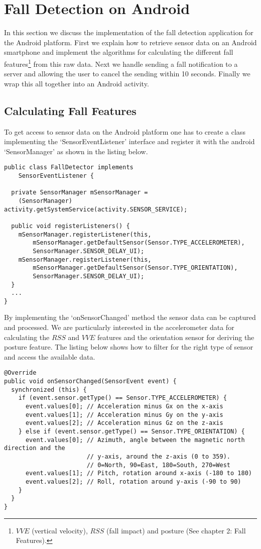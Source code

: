 \documentclass[a4paper, 10pt]{article}
\begin{document}
\section{Fall Detection on Android}
In this section we discuss the implementation of the fall detection application for the Android platform. First we explain how to retrieve sensor data on an Android smartphone and implement the algorithms for calculating the different fall features\footnote{$VVE$ (vertical velocity), $RSS$ (fall impact) and posture (See chapter 2: Fall Features).} from this raw data. Next we handle sending a fall notification to a server and allowing the user to cancel the sending within 10 seconds. Finally we wrap this all together into an Android activity.

\subsection{Calculating Fall Features}
To get access to sensor data on the Android platform one has to create a class implementing the `SensorEventListener' interface and register it with the android `SensorManager' as shown in the listing below.
\begin{lstlisting}
public class FallDetector implements
    SensorEventListener {
    
  private SensorManager mSensorManager = 
    (SensorManager) activity.getSystemService(activity.SENSOR_SERVICE);
    
  public void registerListeners() {
    mSensorManager.registerListener(this,
        mSensorManager.getDefaultSensor(Sensor.TYPE_ACCELEROMETER),
        SensorManager.SENSOR_DELAY_UI);
    mSensorManager.registerListener(this,
        mSensorManager.getDefaultSensor(Sensor.TYPE_ORIENTATION),
        SensorManager.SENSOR_DELAY_UI);
  }  
  ...  
}
\end{lstlisting}
By implementing the `onSensorChanged' method the sensor data can be captured and processed. We are particularly interested in the accelerometer data for calculating the $RSS$ and $VVE$ features and the orientation sensor for deriving the posture feature. The listing below shows how to filter for the right type of sensor and access the available data.
\begin{lstlisting}
@Override
public void onSensorChanged(SensorEvent event) {
  synchronized (this) {
    if (event.sensor.getType() == Sensor.TYPE_ACCELEROMETER) {
      event.values[0]; // Acceleration minus Gx on the x-axis
      event.values[1]; // Acceleration minus Gy on the y-axis
      event.values[2]; // Acceleration minus Gz on the z-axis
    } else if (event.sensor.getType() == Sensor.TYPE_ORIENTATION) {      
      event.values[0]; // Azimuth, angle between the magnetic north direction and the
                       // y-axis, around the z-axis (0 to 359). 
                       // 0=North, 90=East, 180=South, 270=West
      event.values[1]; // Pitch, rotation around x-axis (-180 to 180)
      event.values[2]; // Roll, rotation around y-axis (-90 to 90)
    }
  }
}
\end{lstlisting}
\end{document}
